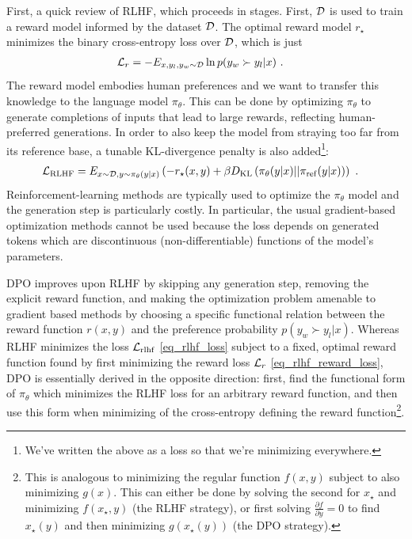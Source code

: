 \documentclass[11pt]{article}
\begin{document}
First, a quick review of RLHF, which proceeds in stages. First, $ \mathcal{D} $ is used to train a reward
model informed by the dataset $ \mathcal{D} $. The optimal reward model $ r_{ \star } $ minimizes the
binary cross-entropy loss over $ \mathcal{D} $, which is just
\begin{align}
  \mathcal{L} _{ r }   &= -E _{ x, y _{ l }, y _{ w } \sim \mathcal{D} } \ln p(y _{ w } \succ y _{ l }| x ) \ . \label{eq_rlhf_reward_loss}
\end{align}
 The reward model embodies human preferences and we want to
transfer this knowledge to the language model $ \pi _{ \theta } $. This can be done by optimizing $
\pi _{ \theta  } $ to generate completions of inputs that lead to large rewards, reflecting
human-preferred generations. In order to also keep the model from straying too far from its
reference base, a tunable KL-divergence penalty is also added\footnote{We've written the above as a
loss so that we're minimizing everywhere.}:
\begin{align}
    \mathcal{L} _{ {\rm RLHF} }  &= E _{x \sim \mathcal{D}, y \sim \pi _{ \theta  }(y|x) } \left ( -r _{ \star }
    (x, y) + \beta D _{ {\rm KL} } \left ( \pi  _{ \theta  }(y|x)|| \pi _{{\rm ref}}(y|x) \right )
\right ) \ . \label{eq_rlhf_loss}
\end{align}
 Reinforcement-learning methods are typically used to optimize the $ \pi _{ \theta  } $ model and
 the generation step is particularly costly.  In particular, the usual gradient-based optimization
 methods cannot be used because the loss depends on generated tokens which are discontinuous
 (non-differentiable) functions of the model's parameters.

DPO improves upon RLHF by skipping any generation step, removing the explicit reward function, and
making the optimization problem amenable to gradient based methods by choosing a specific functional
relation between the reward function $ r(x, y) $ and the preference probability $p(y _{ w } \succ y
_{ l }| x )$. Whereas RLHF minimizes the loss $ \mathcal{L} _{ {\rm rlhf} } $ \eqref{eq_rlhf_loss} subject
to a fixed, optimal reward function found by first minimizing the reward loss $ \mathcal{L} _{ r } $
\eqref{eq_rlhf_reward_loss}, DPO is essentially derived in the opposite direction: first, find the
functional form of $ \pi _{ \theta } $ which minimizes the RLHF loss for an arbitrary reward
function, and then use this form when minimizing of the cross-entropy defining the reward
function\footnote{This is analogous to minimizing the regular function $f(x, y)$ subject to also
    minimizing $ g(x) $. This can either be done by solving the second for $ x _{ \star } $ and
    minimizing $ f(x _{ \star }, y) $ (the RLHF strategy), or first solving $ \frac{ \partial f }{
\partial y  } =0$ to find $ x _{ \star }(y) $ and then minimizing $ g(x _{ \star }(y)) $ (the DPO
strategy).}.
\end{document}
